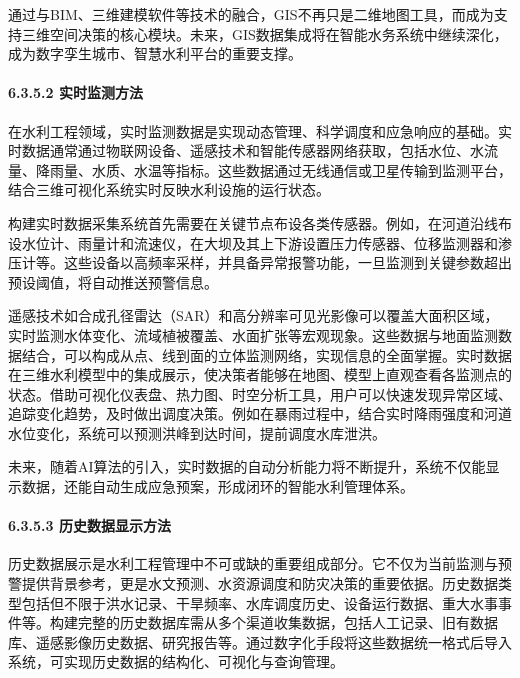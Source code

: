 通过与BIM、三维建模软件等技术的融合，GIS不再只是二维地图工具，而成为支持三维空间决策的核心模块。未来，GIS数据集成将在智能水务系统中继续深化，成为数字孪生城市、智慧水利平台的重要支撑。

\hypertarget{ux5b9eux65f6ux76d1ux6d4bux65b9ux6cd5}{%
\paragraph{6.3.5.2 实时监测方法}\label{ux5b9eux65f6ux76d1ux6d4bux65b9ux6cd5}}

在水利工程领域，实时监测数据是实现动态管理、科学调度和应急响应的基础。实时数据通常通过物联网设备、遥感技术和智能传感器网络获取，包括水位、水流量、降雨量、水质、水温等指标。这些数据通过无线通信或卫星传输到监测平台，结合三维可视化系统实时反映水利设施的运行状态。

构建实时数据采集系统首先需要在关键节点布设各类传感器。例如，在河道沿线布设水位计、雨量计和流速仪，在大坝及其上下游设置压力传感器、位移监测器和渗压计等。这些设备以高频率采样，并具备异常报警功能，一旦监测到关键参数超出预设阈值，将自动推送预警信息。

遥感技术如合成孔径雷达（SAR）和高分辨率可见光影像可以覆盖大面积区域，实时监测水体变化、流域植被覆盖、水面扩张等宏观现象。这些数据与地面监测数据结合，可以构成从点、线到面的立体监测网络，实现信息的全面掌握。实时数据在三维水利模型中的集成展示，使决策者能够在地图、模型上直观查看各监测点的状态。借助可视化仪表盘、热力图、时空分析工具，用户可以快速发现异常区域、追踪变化趋势，及时做出调度决策。例如在暴雨过程中，结合实时降雨强度和河道水位变化，系统可以预测洪峰到达时间，提前调度水库泄洪。

未来，随着AI算法的引入，实时数据的自动分析能力将不断提升，系统不仅能显示数据，还能自动生成应急预案，形成闭环的智能水利管理体系。

\hypertarget{ux5386ux53f2ux6570ux636eux663eux793aux65b9ux6cd5}{%
\paragraph{6.3.5.3 历史数据显示方法}\label{ux5386ux53f2ux6570ux636eux663eux793aux65b9ux6cd5}}

历史数据展示是水利工程管理中不可或缺的重要组成部分。它不仅为当前监测与预警提供背景参考，更是水文预测、水资源调度和防灾决策的重要依据。历史数据类型包括但不限于洪水记录、干旱频率、水库调度历史、设备运行数据、重大水事事件等。构建完整的历史数据库需从多个渠道收集数据，包括人工记录、旧有数据库、遥感影像历史数据、研究报告等。通过数字化手段将这些数据统一格式后导入系统，可实现历史数据的结构化、可视化与查询管理。

